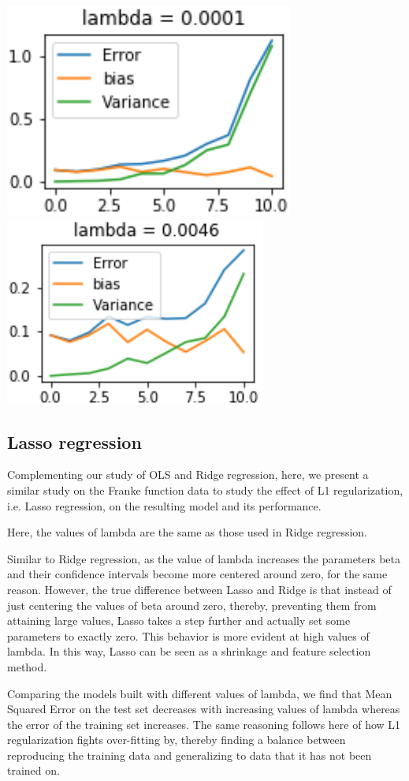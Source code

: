 \documentclass{article}
\begin{document}
\includegraphics[scale=1]{boostrapridge0.png}
\includegraphics[scale=1]{boostrapridge1.png}

\subsection{Lasso regression}
Complementing our study of OLS and Ridge regression, here, we present a similar study on the Franke function data to study the effect of L1 regularization, i.e. Lasso regression, on the resulting model and its performance.

Here, the values of lambda are the same as those used in Ridge regression.

Similar to Ridge regression, as the value of lambda increases the parameters beta and their confidence intervals become more centered around zero, for the same reason. However, the true difference between Lasso and Ridge is that instead of just centering the values of beta around zero, thereby, preventing them from attaining large values, Lasso takes a step further and actually set some parameters to exactly zero. This behavior is more evident at high values of lambda. In this way, Lasso can be seen as a shrinkage and feature selection method.

Comparing the models built with different values of lambda, we find that Mean Squared Error on the test set decreases with increasing values of lambda whereas the error of the training set increases. The same reasoning follows here of how L1 regularization fights over-fitting by, thereby finding a balance between reproducing the training data and generalizing to data that it has not been trained on.
\end{document}
